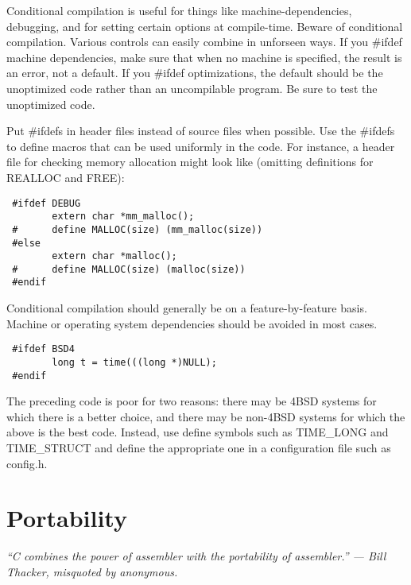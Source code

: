  Conditional compilation is useful for things like machine-dependencies,
debugging, and for setting certain options at compile-time. Beware of
conditional compilation. Various controls can easily combine in unforseen
ways. If you \#ifdef machine dependencies, make sure that when no machine is
specified, the result is an error, not a default. If you \#ifdef optimizations,
the default should be the unoptimized code rather than an uncompilable program.
Be sure to test the unoptimized code. 

 Put \#ifdefs in header files instead of source files when possible. Use the
\#ifdefs to define macros that can be used uniformly in the code. For instance,
a header file for checking memory allocation might look like (omitting
definitions for REALLOC and FREE): 

\begin{verbatim}
 #ifdef DEBUG
        extern char *mm_malloc();
 #      define MALLOC(size) (mm_malloc(size))
 #else
        extern char *malloc();
 #      define MALLOC(size) (malloc(size))
 #endif 
\end{verbatim}

 Conditional compilation should generally be on a feature-by-feature basis.
Machine or operating system dependencies should be avoided in most cases. 
\begin{verbatim}
 #ifdef BSD4
        long t = time(((long *)NULL);
 #endif 
\end{verbatim}
The preceding code is poor for two reasons: there may be 4BSD systems for which
there is a better choice, and there may be non-4BSD systems for which the above
is the best code. Instead, use define symbols such as TIME\_LONG and
TIME\_STRUCT and define the appropriate one in a configuration file such as
config.h. 

\section{Portability}
{\em ``C combines the power of assembler with the portability of assembler.''
 --- Bill Thacker, misquoted by anonymous.}

